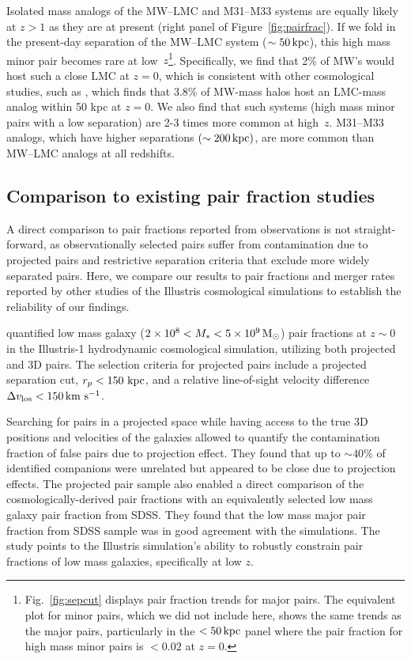 \documentclass[twocolumn]{aastex631}
\begin{document}
    Isolated mass analogs of the MW--LMC and M31--M33 systems are equally likely at $z>1$ as they are at present (right panel of Figure~\ref{fig:pairfrac}). 
    If we fold in the present-day separation of the MW--LMC system ($\sim50 \mathrm{\,kpc}$), this high mass minor pair becomes rare at low~$z$\footnote{Fig.~\ref{fig:sepcut} displays pair fraction trends for major pairs. The equivalent plot for minor pairs, which we did not include here, shows the same trends as the major pairs, particularly in the $<50\mathrm{\,kpc}$ panel where the pair fraction for high mass minor pairs is $<0.02$ at $z=0$.}. Specifically, we find that 2\% of MW's would host such a close LMC at $z=0$, which is consistent with other cosmological studies, such as \citet{Patel2017a-Orbits}, which finds that 3.8\% of MW-mass halos host an LMC-mass analog within 50 kpc at $z=0$. 
    We also find that such systems (high mass minor pairs with a low separation) are 2-3 times more common at high~$z$. M31--M33 analogs, which have higher separations $(\sim200\mathrm{\,kpc})$, are more common than MW--LMC analogs at all redshifts.  


    
\subsection{Comparison to existing pair fraction studies}\label{sec:disc-comp}
    A direct comparison to pair fractions reported from observations is not straight-forward, as observationally selected pairs suffer from contamination due to projected pairs and restrictive separation criteria that exclude more widely separated pairs.
    Here, we compare our results to pair fractions and merger rates reported by other studies of the Illustris cosmological simulations to establish the reliability of our findings. 

        \citet{Besla2018} quantified low mass galaxy ($2\times10^{8} < M_{*} < 5\times10^{9}\,\mathrm{M}_\odot$) pair fractions at $z\sim0$ in the Illustris-1 hydrodynamic cosmological simulation, utilizing both projected and 3D pairs.
        The selection criteria for projected pairs include a projected separation cut, $r_{p} < 150\,\mathrm{\,kpc}$, and a relative line-of-sight velocity difference $\Delta v_{\rm los} < 150\,\mathrm{km}~\mathrm{s}^{-1}$.
        
        Searching for pairs in a projected space while having access to the true 3D positions and velocities of the galaxies allowed \cite{Besla2018} to quantify the contamination fraction of false pairs due to projection effect. 
        They found that up to $\sim40$\% of identified companions were unrelated but appeared to be close due to projection effects. 
        The projected pair sample also enabled a direct comparison of the cosmologically-derived pair fractions with an equivalently selected low mass galaxy pair fraction from SDSS.
        They found that the low mass major pair fraction from SDSS sample was in good agreement with the simulations. The~\citet{Besla2018} study points to the Illustris simulation's ability to robustly constrain pair fractions of low mass galaxies, specifically at low $z$.
\end{document}
